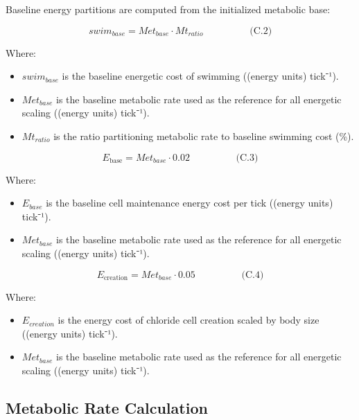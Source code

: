 \documentclass[
]{book}
\begin{document}
Baseline energy partitions are computed from the initialized metabolic
base:

\[
\begin{equation} swim_{base} = Met_{base} \cdot Mt_{ratio}  \hspace{2cm} \text{(C.2)} \end{equation}
\]

Where:

\begin{itemize}
\item
  \(swim_{base}\) is the baseline energetic cost of swimming ((energy
  units) tick⁻¹).
\item
  \(Met_{base}\) is the baseline metabolic rate used as the reference
  for all energetic scaling ((energy units) tick⁻¹).
\item
  \(Mt_{ratio}\) is the ratio partitioning metabolic rate to baseline
  swimming cost (\%).
\end{itemize}

\[
\begin{equation} E_{\text{base}} = Met_{base} \cdot 0.02  \hspace{2cm} \text{(C.3)} \end{equation}
\]

Where:

\begin{itemize}
\item
  \(E_{base}\) is the baseline cell maintenance energy cost per tick
  ((energy units) tick⁻¹).
\item
  \(Met_{base}\) is the baseline metabolic rate used as the reference
  for all energetic scaling ((energy units) tick⁻¹).
\end{itemize}

\[
\begin{equation} E_{\text{creation}} = Met_{base} \cdot 0.05  \hspace{2cm} \text{(C.4)} \end{equation}
\]

Where:

\begin{itemize}
\item
  \(E_{creation}\) is the energy cost of chloride cell creation scaled
  by body size ((energy units) tick⁻¹).
\item
  \(Met_{base}\) is the baseline metabolic rate used as the reference
  for all energetic scaling ((energy units) tick⁻¹).
\end{itemize}

\subsection{Metabolic Rate Calculation}\label{metabolic-rate-calculation}
\end{document}
